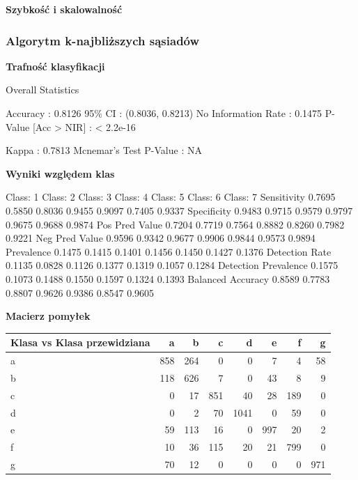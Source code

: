 \documentclass[11pt]{article} %
\begin{document}
\textbf{Szybkość i skalowalność}

\subsubsection{Algorytm k-najbliższych sąsiadów}

\textbf{Trafność klasyfikacji}

Overall Statistics
                                          
               Accuracy : 0.8126          
                 95\% CI : (0.8036, 0.8213)
    No Information Rate : 0.1475          
    P-Value [Acc > NIR] : < 2.2e-16       
                                          
                  Kappa : 0.7813          
 Mcnemar's Test P-Value : NA   

\textbf{Wyniki względem klas}

                    Class: 1 Class: 2 Class: 3 Class: 4 Class: 5 Class: 6 Class: 7
Sensitivity            0.7695   0.5850   0.8036   0.9455   0.9097   0.7405   0.9337
Specificity            0.9483   0.9715   0.9579   0.9797   0.9675   0.9688   0.9874
Pos Pred Value         0.7204   0.7719   0.7564   0.8882   0.8260   0.7982   0.9221
Neg Pred Value         0.9596   0.9342   0.9677   0.9906   0.9844   0.9573   0.9894
Prevalence             0.1475   0.1415   0.1401   0.1456   0.1450   0.1427   0.1376
Detection Rate         0.1135   0.0828   0.1126   0.1377   0.1319   0.1057   0.1284
Detection Prevalence   0.1575   0.1073   0.1488   0.1550   0.1597   0.1324   0.1393
Balanced Accuracy      0.8589   0.7783   0.8807   0.9626   0.9386   0.8547   0.9605

\textbf{Macierz pomyłek}

 \begin{center}
    \begin{tabular}{ | l | r | r | r | r | r | r | r | }
    \hline
 Klasa vs Klasa przewidziana &  a &  b &  c &  d &  e &  f &  g \\ \hline
a &  858 & 264 &   0  &  0 &   7 &   4 &  58 \\
b & 118 & 626 &   7 &   0 &  43 &   8 &   9 \\
c &  0  & 17 &  851 &  40 &  28 & 189   & 0 \\
d &  0   & 2 &  70 & 1041 &   0  & 59 &    0 \\
e &  59  & 113  & 16 &   0 & 997 &  20  &  2 \\
f &  10 &  36 & 115  & 20 &  21  & 799  &  0 \\
g &  70  & 12 &   0 &   0  &  0 &   0 &  971 \\ \hline
    \end{tabular}
\end{center}
\end{document}
